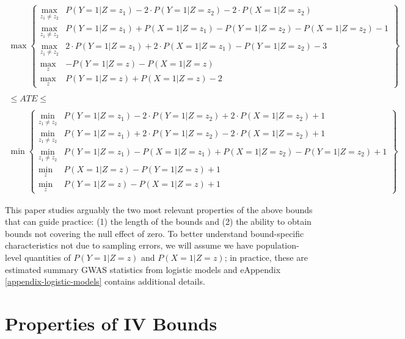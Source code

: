 \documentclass[
]{article}
\theoremstyle{plain}
\begin{document}
\begin{gather}
\max \left \{
\begin{array}{ll}
  \max_{z_1 \neq z_2} & P(Y = 1 | Z = z_1) - 2\cdot P(Y = 1 | Z = z_2) - 2\cdot P(X = 1 | Z = z_2) \\
  \max_{z_1 \neq z_2} & P(Y = 1 | Z = z_1) + P(X = 1 | Z = z_1) - P(Y = 1 | Z = z_2) - P(X = 1 | Z = z_2) - 1 \\
  \max_{z_1 \neq z_2} & 2\cdot P(Y = 1 | Z = z_1) + 2\cdot P(X = 1 | Z = z_1) - P(Y = 1 | Z = z_2) - 3 \\
  \max_z & -P(Y = 1 | Z = z) - P(X = 1 | Z = z) \\
  \max_z & P(Y = 1 | Z = z) +  P(X = 1 | Z = z) - 2
\end{array}
\right \} \nonumber \\ \nonumber \\
\le ATE \le \label{eq:ate_bound} \\ \nonumber \\
\min \left \{
\begin{array}{ll}
  \min_{z_1 \neq z_2} & P(Y = 1 | Z = z_1) - 2\cdot P(Y = 1 | Z = z_2) +  2\cdot P(X = 1 | Z = z_2) + 1 \\
  \min_{z_1 \neq z_2} & P(Y = 1 | Z = z_1) + 2\cdot P(Y = 1 | Z = z_2) -  2\cdot P(X = 1 | Z = z_2) + 1 \\
  \min_{z_1 \neq z_2} & P(Y = 1 | Z = z_1) - P(X = 1 | Z = z_1) + P(X = 1 | Z = z_2) - P(Y = 1 | Z = z_2) + 1 \\
  \min_z & P(X = 1 | Z = z) - P(Y = 1 | Z = z) + 1 \\
  \min_z & P(Y = 1 | Z = z) - P(X = 1 | Z = z) + 1 
\end{array} 
\right \} \nonumber
\end{gather}

This paper studies arguably the two most relevant properties of the above bounds that can guide practice: (1) the length of the bounds and (2) the ability to obtain bounds not covering the null effect of zero. To better understand bound-specific characteristics not due to sampling errors, we will assume we have population-level quantities of \(P(Y = 1 | Z = z)\) and \(P(X = 1 | Z = z)\); in practice, these are estimated summary GWAS statistics from logistic models \autocite{lawlor_mendelian_2008,burgess_sample_2014,verma_simulation_2018,millard_mr-phewas_2019,king_mendelian_2020} and eAppendix \ref{appendix-logistic-models} contains additional details.

\hypertarget{properties-of-iv-bounds}{%
\section{Properties of IV Bounds}\label{properties-of-iv-bounds}}
\end{document}
